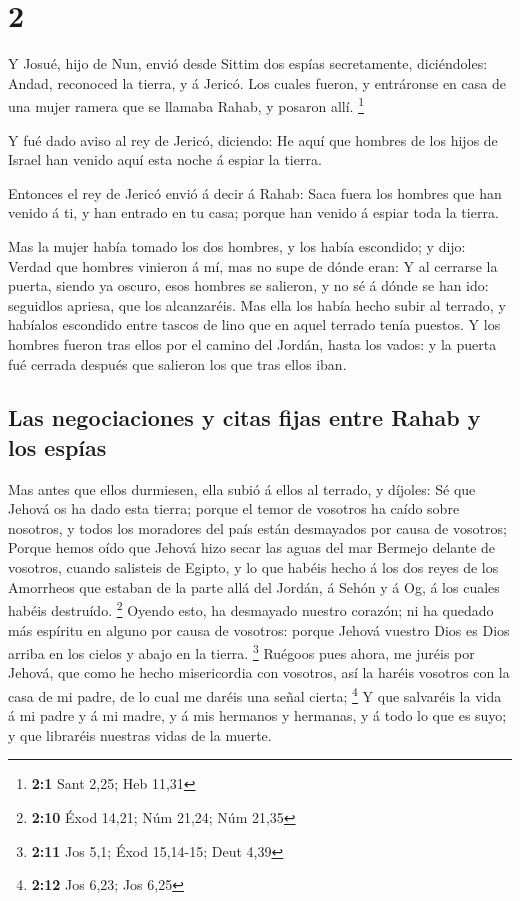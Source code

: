 \hypertarget{section-1}{%
\section{2}\label{section-1}}

 Y Josué, hijo de Nun, envió desde Sittim dos espías
secretamente, diciéndoles: Andad, reconoced la tierra, y á Jericó. Los
cuales fueron, y entráronse en casa de una mujer ramera que se llamaba
Rahab, y posaron allí. \footnote{\textbf{2:1} Sant 2,25; Heb 11,31}

 Y fué dado aviso al rey de Jericó, diciendo: He aquí que
hombres de los hijos de Israel han venido aquí esta noche á espiar la
tierra.

 Entonces el rey de Jericó envió á decir á Rahab: Saca
fuera los hombres que han venido á ti, y han entrado en tu casa; porque
han venido á espiar toda la tierra.

 Mas la mujer había tomado los dos hombres, y los había
escondido; y dijo: Verdad que hombres vinieron á mí, mas no supe de
dónde eran:  Y al cerrarse la puerta, siendo ya oscuro,
esos hombres se salieron, y no sé á dónde se han ido: seguidlos apriesa,
que los alcanzaréis.  Mas ella los había hecho subir al
terrado, y habíalos escondido entre tascos de lino que en aquel terrado
tenía puestos.  Y los hombres fueron tras ellos por el
camino del Jordán, hasta los vados: y la puerta fué cerrada después que
salieron los que tras ellos iban.

\hypertarget{las-negociaciones-y-citas-fijas-entre-rahab-y-los-espuxedas}{%
\subsection{Las negociaciones y citas fijas entre Rahab y los
espías}\label{las-negociaciones-y-citas-fijas-entre-rahab-y-los-espuxedas}}

 Mas antes que ellos durmiesen, ella subió á ellos al
terrado, y díjoles:  Sé que Jehová os ha dado esta tierra;
porque el temor de vosotros ha caído sobre nosotros, y todos los
moradores del país están desmayados por causa de vosotros;
 Porque hemos oído que Jehová hizo secar las aguas del
mar Bermejo delante de vosotros, cuando salisteis de Egipto, y lo que
habéis hecho á los dos reyes de los Amorrheos que estaban de la parte
allá del Jordán, á Sehón y á Og, á los cuales habéis destruído.
\footnote{\textbf{2:10} Éxod 14,21; Núm 21,24; Núm 21,35}
 Oyendo esto, ha desmayado nuestro corazón; ni ha quedado
más espíritu en alguno por causa de vosotros: porque Jehová vuestro Dios
es Dios arriba en los cielos y abajo en la tierra. \footnote{\textbf{2:11}
  Jos 5,1; Éxod 15,14-15; Deut 4,39}  Ruégoos pues ahora,
me juréis por Jehová, que como he hecho misericordia con vosotros, así
la haréis vosotros con la casa de mi padre, de lo cual me daréis una
señal cierta; \footnote{\textbf{2:12} Jos 6,23; Jos 6,25}
 Y que salvaréis la vida á mi padre y á mi madre, y á mis
hermanos y hermanas, y á todo lo que es suyo; y que libraréis nuestras
vidas de la muerte.

